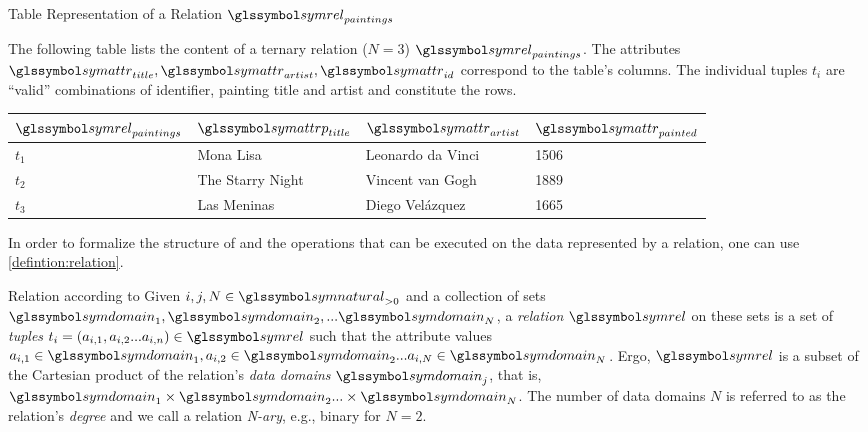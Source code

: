 \begin{example}[label=example:relational_table]{Table Representation of a Relation $\symrel_{paintings}$}{}
    
    The following table lists the content of a ternary relation ($N = 3$) $\symrel_{paintings}$. The attributes $\symattr_{title}, \symattr_{artist}, \symattr_{id}$ correspond to the table's columns. The individual tuples $t_i$ are ``valid'' combinations of identifier, painting title and artist and constitute the rows.
        
    \begin{center}
        \begin{tabular}{ l || l | l | l |}
            $\symrel_{paintings}$ & $\symattrp_{title}$  & $\symattr_{artist}$  & $\symattr_{painted}$ \\ 
            \hline
            \hline
            $t_1$ & Mona Lisa &  Leonardo da Vinci & 1506 \\
            \hline
            $t_2$ & The Starry Night & Vincent van Gogh & 1889 \\
            \hline
            $t_3$ & Las Meninas & Diego Velázquez & 1665 \\
            \hline
        \end{tabular}
    \end{center}
\end{example}

In order to formalize the structure of and the operations that can be executed on the data represented by a relation, one can use \cref{defintion:relation}. 

\begin{definition}[label=defintion:relation]{Relation according to \cite{Codd:1970Relational}}{}
    Given $i,j,N \in \symnatural_{> 0}$ and a collection of sets $\symdomain_1, \symdomain_2, ... \symdomain_N$, a \emph{relation} $\symrel$ on these sets is a set of \emph{tuples} $t_i = (a_{i,1}, a_{i,2} ... a_{i,n}) \in \symrel$ such that the attribute values $a_{i,1} \in \symdomain_1, a_{i,2} \in \symdomain_2 ... a_{i,N} \in \symdomain_N$. Ergo, $\symrel$ is a subset of the Cartesian product of the relation's \emph{data domains} $\symdomain_j$, that is, $\symdomain_1 \times \symdomain_2 ... \times \symdomain_N$. The number of data domains $N$ is referred to as the relation's \emph{degree} and we call a relation \emph{N-ary}, e.g., binary for $N=2$. 
\end{definition}


